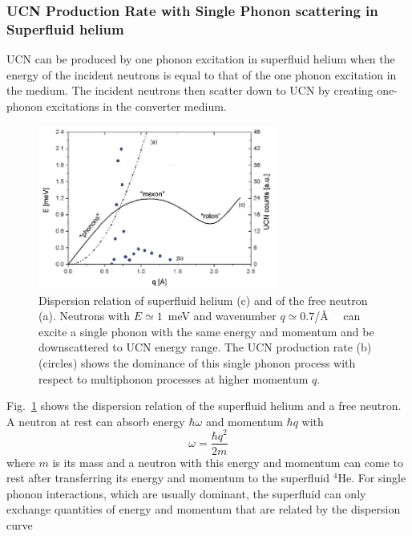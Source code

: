 \subsubsection{UCN Production Rate with Single Phonon scattering in Superfluid helium~\cite{Korobkina2002,Schmidt2009,Golub77}\label{sec:UCN_production}}
UCN can be produced by one phonon excitation in superfluid helium when
the energy of the incident neutrons is equal to that of the one phonon
excitation in the medium. The incident neutrons then scatter down to
UCN by creating one-phonon excitations in the converter medium.
\begin{figure}[h!]
\begin{center}
   \includegraphics[width=0.7\textwidth]{FIG1_2.PNG}
    \caption{\cite{PSI_news} Dispersion relation of superfluid
      helium (c) and of the free neutron (a). Neutrons with $E\simeq
      1$~meV and wavenumber $q \simeq 0.7$/\AA~~ can excite a single
      phonon with the same energy and momentum and be downscattered to
      UCN energy range. The UCN production rate (b)(circles) shows the
      dominance of this single phonon process with respect to
      multiphonon processes at higher momentum $q$.
    }
    \label{fig:FIG1}
    \end{center}
\end{figure} 
Fig.~\ref{fig:FIG1} shows the dispersion relation of the superfluid
helium and a free neutron.  A neutron at rest can absorb energy $\hbar
\omega$ and momentum $\hbar q$ with
\begin{equation}
\label{neutron_energy}
\omega=\frac{\hbar q^2}{2m}
\end{equation}
where $m$ is its mass and a neutron with this energy and momentum can
come to rest after transferring its energy and momentum to the
superfluid $^4$He.  For single phonon interactions, which are usually
dominant, the superfluid can only exchange quantities of energy and
momentum that are related by the dispersion curve

